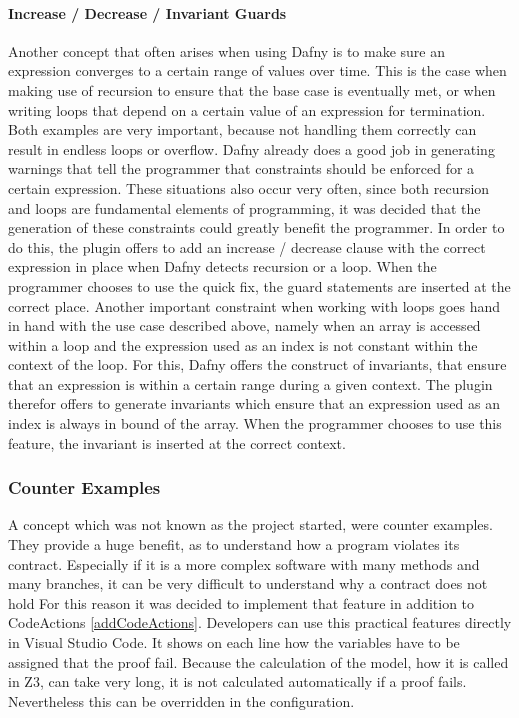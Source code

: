 \paragraph{Increase / Decrease / Invariant Guards}
Another concept that often arises when using Dafny is to make sure an expression converges to a certain range of values over time. This is the case when making use of recursion to ensure that the base case is eventually met, or when writing loops that depend on a certain value of an expression for termination. Both examples are very important, because not handling them correctly can result in endless loops or overflow. Dafny already does a good job in generating warnings that tell the programmer that constraints should be enforced for a certain expression. \newline
These situations also occur very often, since both recursion and loops are fundamental elements of programming, it was decided that the generation of these constraints could greatly benefit the programmer. In order to do this, the plugin offers to add an increase / decrease clause with the correct expression in place when Dafny detects recursion or a loop. When the programmer chooses to use the quick fix, the guard statements are inserted at the correct place. Another important constraint when working with loops goes hand in hand with the use case described above, namely when an array is accessed within a loop and the expression used as an index is not constant within the context of the loop. For this, Dafny offers the construct of invariants, that ensure that an expression is within a certain range during a given context. The plugin therefor offers to generate invariants which ensure that an expression used as an index is always in bound of the array. When the programmer chooses to use this feature, the invariant is inserted at the correct context. 
\subsubsection{Counter Examples}
A concept which was not known as the project started, were counter examples. They provide a huge benefit, as to understand how a program violates its contract. Especially if it is a more complex software with many methods and many branches, it can be very difficult to understand why a contract does not hold\newline
For this reason it was decided to implement that feature in addition to CodeActions \ref{addCodeActions}. 
Developers can use this practical features directly in Visual Studio Code. It shows on each line how the variables have to be assigned that the proof fail. \newline
Because the calculation of the model, how it is called in Z3, can take very long, it is not calculated automatically if a proof fails. Nevertheless this can be overridden in the configuration. 
